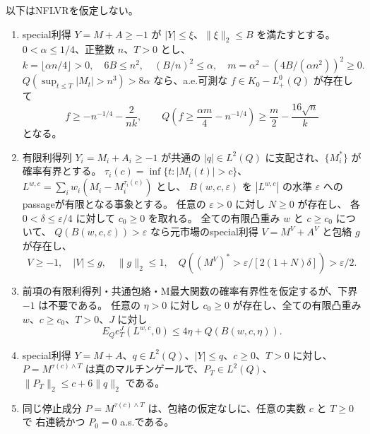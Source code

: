 \begin{proposition}[有限尺度の定量評価]\label{input:finite}
以下はNFLVRを仮定しない。
\leavevmode\par
\begin{enumerate}
\item {}
special利得 $Y=M+A\geq-1$ が $|Y|\leq\xi$、$\|\xi\|_2\leq B$ を満たすとする。
$0<\alpha\leq1/4$、正整数 $n$、$T>0$ とし、
\[
 k=\lfloor\alpha n/4\rfloor>0,\quad 6B\leq n^2,\quad (B/n)^2\leq\alpha,
 \quad m=\alpha^2-(4B/(\alpha n^2))^2\geq0.
\]
$Q(\sup_{t\leq T}|M_t|>n^3)>8\alpha$ なら、a.e.可測な $f\in K_0-L^0_+(Q)$ が存在して
\[
 f\geq-n^{-1/4}-\frac2{nk},\qquad
 Q\left(f\geq\frac{\alpha m}4-n^{-1/4}\right)
 \geq\frac m2-\frac{16\sqrt n}{k}
\]
となる。
\item {}
有限利得列 $Y_i=M_i+A_i\geq-1$ が共通の $|q|\in L^2(Q)$ に支配され、$\{M_i^*\}$ が確率有界とする。
$\tau_i(c)=\inf\{t:|M_i(t)|>c\}$、$L^{w,c}=\sum_iw_i(M_i-M_i^{\tau_i(c)})$ とし、
$B(w,c,\varepsilon)$ を $|L^{w,c}|$ の水準 $\varepsilon$ へのpassageが有限となる事象とする。
任意の $\varepsilon>0$ に対し $N\geq0$ が存在し、
各 $0<\delta\leq\varepsilon/4$ に対して $c_0\geq0$ を取れる。
全ての有限凸重み $w$ と $c\geq c_0$ について、
$Q(B(w,c,\varepsilon))>\varepsilon$ なら元市場のspecial利得 $V=M^V+A^V$ と包絡 $g$ が存在し、
\[
 V\geq-1,\quad |V|\leq g,\quad \|g\|_2\leq1,\quad
 Q((M^V)^*>\varepsilon/[2(1+N)\delta])>\varepsilon/2.
\]
\item {}
前項の有限利得列・共通包絡・M最大関数の確率有界性を仮定するが、下界 $-1$ は不要である。
任意の $\eta>0$ に対し $c_0\geq0$ が存在し、全ての有限凸重み $w$、$c\geq c_0$、$T>0$、$J$ に対し
\[
 E_Q e_T^J(L^{w,c},0)\leq4\eta+Q(B(w,c,\eta)).
\]
\item {}
special利得 $Y=M+A$、$q\in L^2(Q)$、$|Y|\leq q$、$c\geq0$、$T>0$ に対し、
$P=M^{\tau(c)\wedge T}$ は真のマルチンゲールで、$P_T\in L^2(Q)$、
$\|P_T\|_2\leq c+6\|q\|_2$ である。
\item {}
同じ停止成分 $P=M^{\tau(c)\wedge T}$ は、包絡の仮定なしに、任意の実数 $c$ と $T\geq0$ で
右連続かつ $P_0=0$ a.s.である。
\end{enumerate}
\end{proposition}


